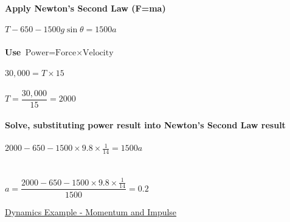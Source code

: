 \documentclass{article}[18pt]
\begin{document}
\\
\\
\textbf{Apply Newton's Second Law (F=ma)}\\
\\
$T-650-1500g\sin\theta=1500a$\\
\\
\textbf{Use $\text{Power=Force}\times\text{Velocity}$}\\
\\
$30,000=T\times15$\\
\\
$T=\dfrac{30,000}{15}=2000$\\
\\
\textbf{Solve, substituting power result into Newton's Second Law result}\\
\\
$2000-650-1500\times9.8\times\frac{1}{14}=1500a$\\
\\
\\
$a=\dfrac{2000-650-1500\times9.8\times\frac{1}{14}}{1500}=0.2$
\newpage
\begin{center}
\underline{\huge Dynamics Example - Momentum and Impulse}
\end{center}
\end{document}
